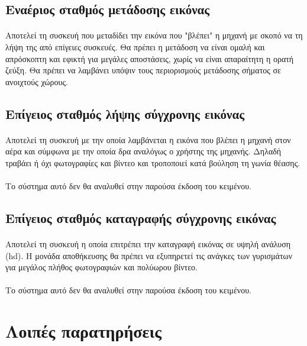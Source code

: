 \documentclass[a4paper, 12pt, twoside]{report}
\begin{document}
{{{{{{		\subsection{Εναέριος σταθμός μετάδοσης εικόνας}	
			\paragraph{}{Αποτελεί τη συσκευή που μεταδίδει την εικόνα που "βλέπει" η μηχανή με σκοπό να τη λήψη της από επίγειες συσκευές. Θα πρέπει η μετάδοση να είναι ομαλή και απρόσκοπτη και εφικτή για μεγάλες αποστάσεις, χωρίς να είναι απαραίτητη η ορατή ζεύξη. Θα πρέπει να λαμβάνει υπόψιν τους περιορισμούς μετάδοσης σήματος σε ανοιχτούς χώρους.
			}
		
		\subsection{Επίγειος σταθμός λήψης σύγχρονης εικόνας}	
			\paragraph{}{Αποτελεί τη συσκευή με την οποία λαμβάνεται η εικόνα που βλέπει η μηχανή στον αέρα και σύμφωνα με την οποία δρα αναλόγως ο χρήστης της μηχανής. Δηλαδή τραβάει ή όχι φωτογραφίες και βίντεο και τροποποιεί κατά βούληση τη γωνία θέασης.
			}
			\paragraph{}{Το σύστημα αυτό δεν θα αναλυθεί στην παρούσα έκδοση του κειμένου.}
			
		\subsection{Επίγειος σταθμός καταγραφής σύγχρονης εικόνας}
			\paragraph{}{Αποτελεί τη συσκευή η οποία επιτρέπει την καταγραφή εικόνας σε υψηλή ανάλυση (hd). Η μονάδα αποθήκευσης θα πρέπει να εξυπηρετεί τις ανάγκες των γυρισμάτων για μεγάλος πλήθος φωτογραφιών και πολύωρου βίντεο.
			}
			\paragraph{}{Το σύστημα αυτό δεν θα αναλυθεί στην παρούσα έκδοση του κειμένου.}
			
		\section{Λοιπές παρατηρήσεις}
		
}}}}}}
\end{document}
